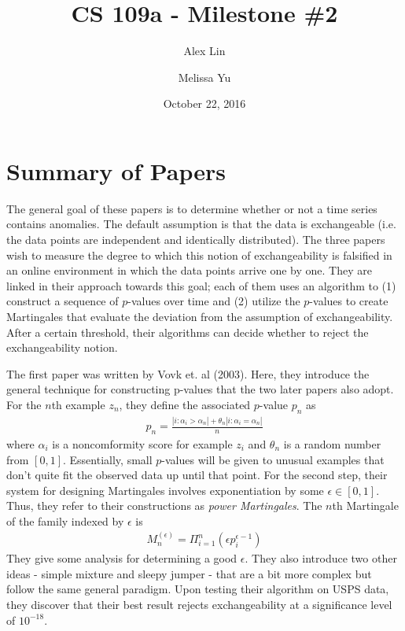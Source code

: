 \documentclass[11pt, margin=1in]{article}
\newcommand{\card}[1]{\ensuremath{\left\vert#1\right\vert}}
\begin{document}
\title{CS 109a - Milestone \#2}
\author{Alex Lin \and Melissa Yu}
\date{October 22, 2016}
\maketitle

\section{Summary of Papers}
The general goal of these papers is to determine whether or not a time series contains anomalies.  The default assumption is that the data is exchangeable (i.e. the data points are independent and identically distributed).  The three papers wish to measure the degree to which this notion of exchangeability is falsified in an online environment in which the data points arrive one by one.  They are linked in their approach towards this goal; each of them uses an algorithm to (1) construct a sequence of $p$-values over time and (2) utilize the $p$-values to create Martingales that evaluate the deviation from the assumption of exchangeability.  After a certain threshold, their algorithms can decide whether to reject the exchangeability notion. 

The first paper was written by Vovk et. al (2003).  Here, they introduce the general technique for constructing p-values that the two later papers also adopt.  For the $n$th example $z_n$, they define the associated $p$-value $p_n$ as 
\begin{align*}
p_n = \frac{\card{i : \alpha_i > \alpha_n} + \theta_n  \card{i : \alpha_i = \alpha_n}}{n}
\end{align*}   
where $\alpha_i$ is a noncomformity score for example $z_i$ and $\theta_n$ is a random number from $[0, 1]$.  Essentially, small $p$-values will be given to unusual examples that don't quite fit the observed data up until that point.  For the second step, their system for designing Martingales involves exponentiation by some $\epsilon \in [0, 1]$.  Thus, they refer to their constructions as \emph{power Martingales}.  The $n$th Martingale of the family indexed by $\epsilon$ is
\begin{align*}
M_n^{(\epsilon)} = \Pi_{i = 1}^n (\epsilon p_i^{\epsilon - 1})
\end{align*}
They give some analysis for determining a good $\epsilon$.  They also introduce two other ideas - simple mixture and sleepy jumper - that are a bit more complex but follow the same general paradigm.  Upon testing their algorithm on USPS data, they discover that their best result rejects exchangeability at a significance level of $10^{-18}$.
   
\end{document}
